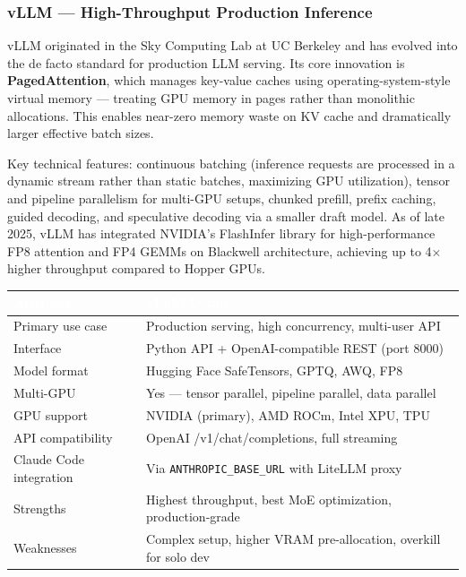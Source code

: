 \documentclass[11pt,letterpaper]{article}
\newcommand{\tableheader}[1]{\textbf{\sffamily\textcolor{white}{#1}}}
\begin{document}
\subsubsection{vLLM --- High-Throughput Production Inference}

vLLM originated in the Sky Computing Lab at UC Berkeley and has evolved into the de facto standard for production LLM serving. Its core innovation is \textbf{PagedAttention}, which manages key-value caches using operating-system-style virtual memory --- treating GPU memory in pages rather than monolithic allocations. This enables near-zero memory waste on KV cache and dramatically larger effective batch sizes.

Key technical features: continuous batching (inference requests are processed in a dynamic stream rather than static batches, maximizing GPU utilization), tensor and pipeline parallelism for multi-GPU setups, chunked prefill, prefix caching, guided decoding, and speculative decoding via a smaller draft model. As of late 2025, vLLM has integrated NVIDIA's FlashInfer library for high-performance FP8 attention and FP4 GEMMs on Blackwell architecture, achieving up to 4$\times$ higher throughput compared to Hopper GPUs.

\begin{center}
\begin{tabularx}{\textwidth}{L{2.8cm}X}
\toprule
{}
\tableheader{Attribute} & \tableheader{vLLM Detail} \\
\midrule
Primary use case & Production serving, high concurrency, multi-user API \\
Interface & Python API + OpenAI-compatible REST (port 8000) \\
Model format & Hugging Face SafeTensors, GPTQ, AWQ, FP8 \\
Multi-GPU & Yes --- tensor parallel, pipeline parallel, data parallel \\
GPU support & NVIDIA (primary), AMD ROCm, Intel XPU, TPU \\
API compatibility & OpenAI /v1/chat/completions, full streaming \\
Claude Code integration & Via \texttt{ANTHROPIC\_BASE\_URL} with LiteLLM proxy \\
Strengths & Highest throughput, best MoE optimization, production-grade \\
Weaknesses & Complex setup, higher VRAM pre-allocation, overkill for solo dev \\
\bottomrule
\end{tabularx}
\end{center}
\end{document}
